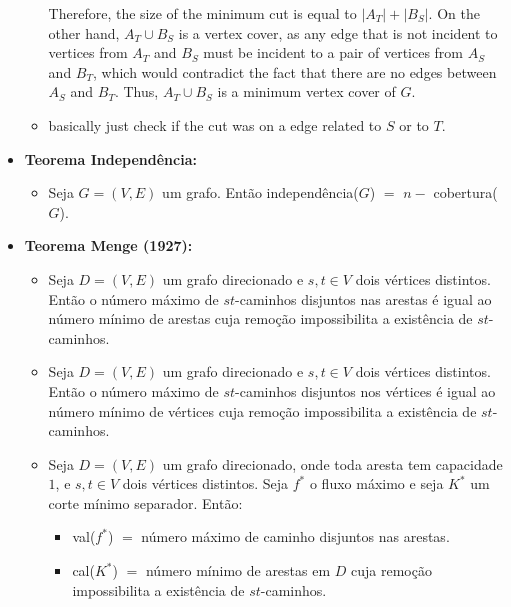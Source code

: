\begin{itemize}
\begin{itemize}
Therefore, the size of the minimum cut is equal to 
$\displaystyle |A_{T}|+|B_{S}|$. On the other hand, 
$\displaystyle A_{T}\cup B_{S}$ is a vertex cover, as any edge that is not incident to vertices from 
$\displaystyle A_{T}$ and
$\displaystyle B_{S}$ must be incident to a pair of vertices from 
$\displaystyle A_{S}$ and 
$\displaystyle B_{T}$, which would contradict the fact that there are no edges between 
$\displaystyle A_{S}$ and 
$\displaystyle B_{T}$.
Thus, 
$\displaystyle A_{T}\cup B_{S}$ is a minimum vertex cover of 
$\displaystyle G$.
\item basically just check if the cut was on a edge related to $S$ or to $T$.
        \end{itemize}
        \item \textbf{Teorema Independência:}
        \begin{itemize}
            \item Seja $G=(V, E)$ um grafo. Então independência($G$) $=$ $n - $ cobertura($G$).
        \end{itemize}
        \item \textbf{Teorema Menge (1927):}
        \begin{itemize}
            \item Seja $D=(V, E)$ um grafo direcionado e $s,t \in V$ dois vértices distintos. Então o número máximo de $st$-caminhos disjuntos nas arestas é igual ao número mínimo de arestas cuja remoção impossibilita a existência de $st$-caminhos.
            \item Seja $D=(V, E)$ um grafo direcionado e $s,t \in V$ dois vértices distintos. Então o número máximo de $st$-caminhos disjuntos nos vértices é igual ao número mínimo de vértices cuja remoção impossibilita a existência de $st$-caminhos.
            \item Seja $D=(V, E)$ um grafo direcionado, onde toda aresta tem capacidade $1$, e $s,t \in V$ dois vértices distintos. Seja $f^*$ o fluxo máximo e seja $K^*$ um corte mínimo separador. Então:
            \begin{itemize}
                \item val($f^*$) $=$ número máximo de caminho disjuntos nas arestas.
                \item cal($K^*$) $=$ número mínimo de arestas em $D$ cuja remoção impossibilita a existência de $st$-caminhos.
            \end{itemize}
        \end{itemize}
    \end{itemize}


